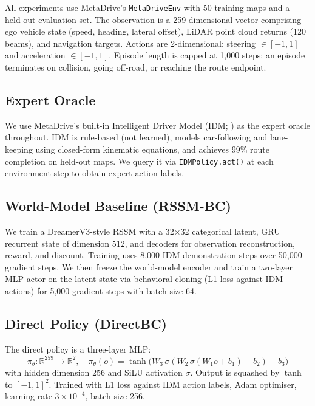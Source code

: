 \documentclass{article}
\begin{document}
All experiments use MetaDrive's \texttt{MetaDriveEnv} with 50 training maps
and a held-out evaluation set. The observation is a 259-dimensional vector
comprising ego vehicle state (speed, heading, lateral offset), LiDAR point
cloud returns (120 beams), and navigation targets. Actions are 2-dimensional:
steering $\in [-1, 1]$ and acceleration $\in [-1, 1]$. Episode length is
capped at 1{,}000 steps; an episode terminates on collision, going off-road,
or reaching the route endpoint.

\subsection{Expert Oracle}

We use MetaDrive's built-in Intelligent Driver Model (IDM;
\citealt{treiber2000idm}) as the expert oracle throughout. IDM is
rule-based (not learned), models car-following and lane-keeping using
closed-form kinematic equations, and achieves 99\% route completion on
held-out maps. We query it via \texttt{IDMPolicy.act()} at each environment
step to obtain expert action labels.

\subsection{World-Model Baseline (RSSM-BC)}

We train a DreamerV3-style RSSM \citep{hafner2023dreamerv3,hafner2019rssm}
with a 32$\times$32 categorical latent, GRU recurrent state of dimension
512, and decoders for observation reconstruction, reward, and discount.
Training uses 8{,}000 IDM demonstration steps over 50{,}000 gradient
steps. We then freeze the world-model encoder and train a two-layer MLP
actor on the latent state via behavioral cloning (L1 loss against IDM
actions) for 5{,}000 gradient steps with batch size 64.

\subsection{Direct Policy (DirectBC)}

The direct policy is a three-layer MLP:
\[
  \pi_\theta : \mathbb{R}^{259} \to \mathbb{R}^2, \quad
  \pi_\theta(o) = \tanh\!\bigl(W_3\,\sigma(W_2\,\sigma(W_1 o + b_1) + b_2) + b_3\bigr)
\]
with hidden dimension 256 and SiLU activation $\sigma$. Output is squashed
by $\tanh$ to $[-1,1]^2$. Trained with L1 loss against IDM action labels,
Adam optimiser, learning rate $3\times10^{-4}$, batch size 256.
\end{document}
